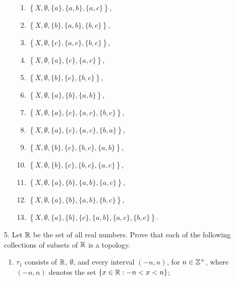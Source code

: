 \documentclass[a4paper, 12pt]{config/homework}
\begin{document}
\begin{enumerate}
\begin{minipage}[t]{0.54\textwidth}
\begin{enumerate}
\begin{enumerate}[label=\roman*.]
\item \(\left\{X,\emptyset, \{a\}, \{a,b\}, \{a,c\} \right\}\),
\item \(\left\{X,\emptyset, \{b\}, \{a,b\}, \{b,c\} \right\}\),
\item \(\left\{X,\emptyset, \{c\}, \{a,c\}, \{b,c\} \right\}\),
\item \(\left\{X,\emptyset, \{a\}, \{c\}, \{a,c\} \right\}\),
\item \(\left\{X,\emptyset, \{b\}, \{c\}, \{b,c\} \right\}\),
\item \(\left\{X,\emptyset, \{a\}, \{b\}, \{a,b\} \right\}\),
\item \(\left\{X,\emptyset, \{a\}, \{c\}, \{a,c\}, \{b,c\} \right\}\),
\item \(\left\{X,\emptyset, \{a\}, \{c\}, \{a,c\}, \{b,a\} \right\}\),
\item \(\left\{X,\emptyset, \{b\}, \{c\}, \{b,c\}, \{a,b\} \right\}\),
\item \(\left\{X,\emptyset, \{b\}, \{c\}, \{b,c\}, \{a,c\} \right\}\),
\item \(\left\{X,\emptyset, \{a\}, \{b\}, \{a,b\}, \{a,c\} \right\}\),
\item \(\left\{X,\emptyset, \{a\}, \{b\}, \{a,b\}, \{b,c\} \right\}\),
\item \(\left\{X,\emptyset, \{a\}, \{b\}, \{c\}, \{a,b\}, \{a,c\}, \{b,c\} \right\}\).
\end{enumerate}
\end{enumerate}
\end{minipage}
\restoregeometry%

\pagebreak
\item[5.] Let \(\mathbb{R}\) be the set of all real numbers. Prove that each of the following collections of subsets of \(\mathbb{R}\) is a topology.
\begin{enumerate}[label=(\roman*)]
\item \(\tau_1\) consists of \(\mathbb{R}\), \(\emptyset\), and every interval \((-n,n)\), for \(n\in\mathbb{Z}^+\), where \((-n,n)\) denotes the set \(\left\{x\in\mathbb{R}:-n<x<n\right\}\);



\end{enumerate}
\end{enumerate}
\end{document}
